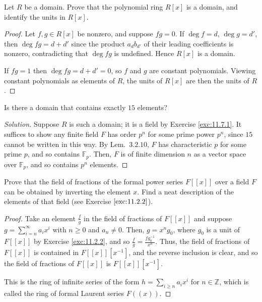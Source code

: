 \documentclass[12pt]{article}
\theoremstyle{remark}
\begin{document}
\begin{problem}
  Let $R$ be a domain. Prove that the polynomial ring $R[x]$ is a domain, and identify the units in $R[x]$.
\end{problem}
\begin{proof}
  Let $f,g \in R[x]$ be nonzero, and suppose $fg = 0$. If $\deg f = d$, $\deg g = d'$, then $\deg fg = d+d'$ since the product $a_db_{d'}$ of their leading coefficients is nonzero, contradicting that $\deg fg$ is undefined. Hence $R[x]$ is a domain.
  \par If $fg = 1$ then $\deg fg = d+d' = 0$, so $f$ and $g$ are constant polynomials. Viewing constant polynomials as elements of $R$, the units of $R[x]$ are then the units of $R$.
\end{proof}

\begin{problem}
  Is there a domain that contains exactly $15$ elements?
\end{problem}
\begin{proof}[Solution]
  Suppose $R$ is such a domain; it is a field by Exercise \ref{exc:11.7.1}. It suffices to show any finite field $F$ has order $p^n$ for some prime power $p^n$, since $15$ cannot be written in this way. By Lem.~$3.2.10$, $F$ has characteristic $p$ for some prime $p$, and so contains $\mathbb{F}_p$. Then, $F$ is of finite dimension $n$ as a vector space over $\mathbb{F}_p$, and so contains $p^n$ elements.
\end{proof}

\begin{problem}
  Prove that the field of fractions of the formal power series $F[[x]]$ over a field $F$ can be obtained by inverting the element $x$.  Find a neat description of the elements of that field (see Exercise $\ref{exc:11.2.2}$).
\end{problem}
\begin{proof}
  Take an element $\frac{f}{g}$ in the field of fractions of $F[[x]]$ and suppose $g = \sum_{i = n}^\infty a_i x^i$ with $n \ge 0$ and $a_n \neq 0$. Then, $g = x^n g_0$, where $g_0$ is a unit of $F[[x]]$ by Exercise \ref{exc:11.2.2}, and so $\frac{f}{g} = \frac{fg_0^{-1}}{x^n}$. Thus, the field of fractions of $F[[x]]$ is contained in $F[[x]][x^{-1}]$, and the reverse inclusion is clear, and so the field of fractions of $F[[x]]$ is $F[[x]][x^{-1}]$.
  \par This is the ring of infinite series of the form $h = \sum_{i \ge n} a_ix^i$ for $n \in \mathbb{Z}$, which is called the ring of formal Laurent series $F((x))$.
\end{proof}
\end{document}
